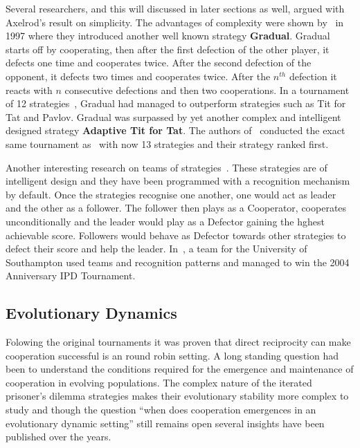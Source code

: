 \documentclass{article}
\theoremstyle{definition}
\begin{document}
Several researchers, and this will discussed in later sections as well, argued
with Axelrod's result on simplicity. The advantages of complexity were shown
by~\cite{Beaufils1997} in 1997 where they introduced another well known strategy
\textbf{Gradual}. Gradual starts off by cooperating,
then after the first defection of the other player, it defects one time and cooperates
twice. After the second defection of the opponent, it defects two times and cooperates
twice. After the \(n^{th}\) defection it reacts with \(n\) consecutive defections 
and then two cooperations. In a tournament of 12 strategies~\cite{Beaufils1997},
Gradual had managed to outperform strategies such as Tit for Tat and Pavlov.
Gradual was surpassed by yet another complex and intelligent designed strategy
\textbf{Adaptive Tit for Tat}. The authors of~\cite{tzafestas-2000a} conducted
the exact same tournament as~\cite{Beaufils1997} with now 13 strategies and their
strategy ranked first.

Another interesting research on teams of strategies~\cite{J.P.Delahaye1993Lp,
J.P.Delahaye1995LIeP, A.Rogers2007Ctpw}. These strategies are of
intelligent design and they have been programmed with a recognition mechanism
by default. Once the strategies recognise one another, one would act as leader
and the other as a follower. The follower then plays as a Cooperator, cooperates
unconditionally and the leader would play as a Defector gaining the hghest achievable
score. Followers would behave as Defector towards other strategies to defect
their score and help the leader. In~\cite{A.Rogers2007Ctpw}, a team for the University
of Southampton used teams and recognition patterns and managed to win the 2004
Anniversary IPD Tournament.


\subsection{Evolutionary Dynamics}\label{subsection:evoandinflutionary_dynamics}

Folowing the original tournaments it was proven that direct reciprocity can
make cooperation successful is an round robin setting. A long standing question
had been to understand the conditions required for the emergence and maintenance
of cooperation in evolving populations.
The complex nature of the iterated prisoner's dilemma strategies makes
their evolutionary stability more complex to study and though the question ``when does
cooperation emergences in an evolutionary dynamic setting'' still remains open several
insights have been published over the years.
\end{document}
